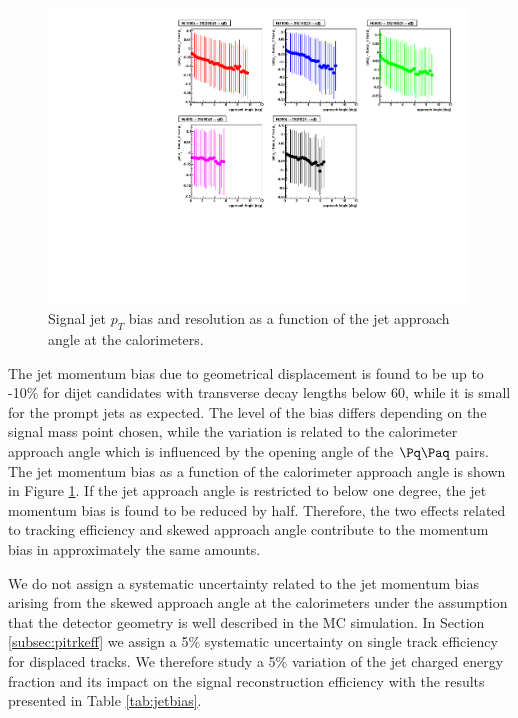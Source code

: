 \begin{figure}[htbp]
\centering
\includegraphics[width=0.99\textwidth]{plots/signal/biasapproachAngle.pdf}
\caption{Signal jet $p_T$ bias and resolution as a function of the jet approach angle at the calorimeters.\label{fig:jetbiasAngle}}
\end{figure} 

The jet momentum bias due to geometrical displacement is found to be up to -10\% for dijet candidates with transverse
decay lengths below 60\cm, while it is small for the prompt jets as expected. The level of the bias differs
depending on the signal mass point chosen, while the variation is related to the calorimeter approach angle
which is influenced by the opening angle of the $\qq$ pairs.
The jet momentum bias as a function of the calorimeter approach angle is shown in Figure \ref{fig:jetbiasAngle}.
If the jet approach angle is restricted to below one degree, the jet momentum bias is found to be reduced by half.
 Therefore, the two effects related to tracking efficiency and skewed approach angle contribute to the 
momentum bias in approximately the same amounts.

We do not assign a systematic uncertainty related to the jet momentum bias arising from the skewed approach angle 
at the calorimeters under the assumption that the detector geometry is well described in the MC simulation.
In Section \ref{subsec:pitrkeff} we assign a 5\% systematic uncertainty on single track efficiency for 
displaced tracks. We therefore study a 5\% variation of the jet charged energy
fraction and its impact on the signal reconstruction efficiency with the results presented 
in Table \ref{tab:jetbias}. 

